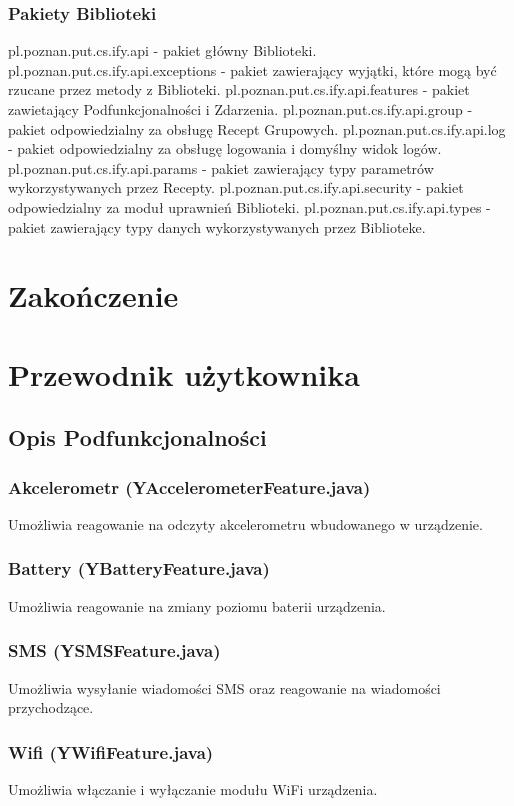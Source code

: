 \documentclass[11pt,a4paper,polish,thesis]{dcsbook}
\begin{document}
\subsection{Pakiety Biblioteki}
pl.poznan.put.cs.ify.api - pakiet główny Biblioteki.
pl.poznan.put.cs.ify.api.exceptions - pakiet zawierający wyjątki, które mogą być rzucane przez metody z Biblioteki.
pl.poznan.put.cs.ify.api.features - pakiet zawietający Podfunkcjonalności i Zdarzenia.
pl.poznan.put.cs.ify.api.group - pakiet odpowiedzialny za obsługę Recept Grupowych.
pl.poznan.put.cs.ify.api.log - pakiet odpowiedzialny za obsługę logowania i domyślny widok logów.
pl.poznan.put.cs.ify.api.params - pakiet zawierający typy parametrów wykorzystywanych przez Recepty.
pl.poznan.put.cs.ify.api.security - pakiet odpowiedzialny za moduł uprawnień Biblioteki.
pl.poznan.put.cs.ify.api.types - pakiet zawierający typy danych wykorzystywanych przez Biblioteke.
\chapter{Zakończenie}

\appendix

\chapter{Przewodnik użytkownika}
\section{Opis Podfunkcjonalności}
\subsection{Akcelerometr (YAccelerometerFeature.java)}
Umożliwia reagowanie na odczyty akcelerometru wbudowanego w urządzenie. 

\subsection{Battery (YBatteryFeature.java)}
Umożliwia reagowanie na zmiany poziomu baterii urządzenia.

\subsection{SMS (YSMSFeature.java)}
Umożliwia wysyłanie wiadomości SMS oraz reagowanie na wiadomości przychodzące.

\subsection{Wifi (YWifiFeature.java)}
Umożliwia włączanie i wyłączanie modułu WiFi urządzenia.
\end{document}
